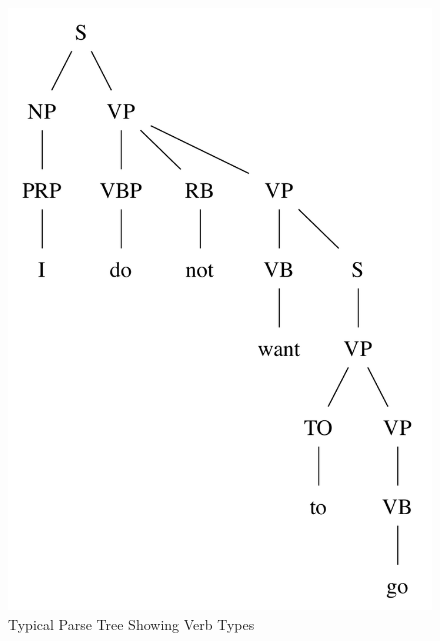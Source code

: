 \documentclass[main.tex]{subfiles}
\begin{document}
\begin{figure}[htbp]
\centering
\includegraphics[scale=0.6]{verb-parse.pdf}
\caption{Typical Parse Tree Showing Verb Types}
\label{fig:verb-parse}
\end{figure}
\end{document}
